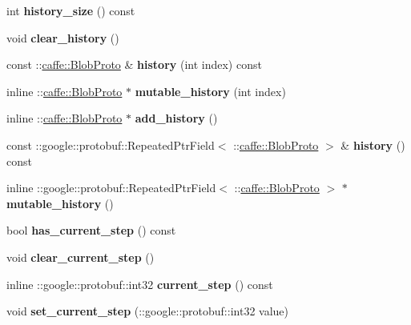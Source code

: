 \begin{DoxyCompactItemize}
int {\bfseries history\+\_\+size} () const
\item 
\mbox{\label{classcaffe_1_1_solver_state_ad98f3aa6b948cad80da8fd72570877a2}} 
void {\bfseries clear\+\_\+history} ()
\item 
\mbox{\label{classcaffe_1_1_solver_state_a9fec48ef8250b0900266065b971965c6}} 
const \+::\mbox{\hyperlink{classcaffe_1_1_blob_proto}{caffe\+::\+Blob\+Proto}} \& {\bfseries history} (int index) const
\item 
\mbox{\label{classcaffe_1_1_solver_state_a73b2b199b5419a7eff268b0538c77fc7}} 
inline \+::\mbox{\hyperlink{classcaffe_1_1_blob_proto}{caffe\+::\+Blob\+Proto}} $\ast$ {\bfseries mutable\+\_\+history} (int index)
\item 
\mbox{\label{classcaffe_1_1_solver_state_a37aaf2b5da324ce6027133ad365fcb21}} 
inline \+::\mbox{\hyperlink{classcaffe_1_1_blob_proto}{caffe\+::\+Blob\+Proto}} $\ast$ {\bfseries add\+\_\+history} ()
\item 
\mbox{\label{classcaffe_1_1_solver_state_af12b1f7a30482570f52ad4c43c80c051}} 
const \+::google\+::protobuf\+::\+Repeated\+Ptr\+Field$<$ \+::\mbox{\hyperlink{classcaffe_1_1_blob_proto}{caffe\+::\+Blob\+Proto}} $>$ \& {\bfseries history} () const
\item 
\mbox{\label{classcaffe_1_1_solver_state_abfa60fcbd2e29e327a987a3e83d6694c}} 
inline \+::google\+::protobuf\+::\+Repeated\+Ptr\+Field$<$ \+::\mbox{\hyperlink{classcaffe_1_1_blob_proto}{caffe\+::\+Blob\+Proto}} $>$ $\ast$ {\bfseries mutable\+\_\+history} ()
\item 
\mbox{\label{classcaffe_1_1_solver_state_aaff55a8c2e95ffd00f32014cb1b3fb6f}} 
bool {\bfseries has\+\_\+current\+\_\+step} () const
\item 
\mbox{\label{classcaffe_1_1_solver_state_ad64551e9bac605fd329ffcf6ac56790c}} 
void {\bfseries clear\+\_\+current\+\_\+step} ()
\item 
\mbox{\label{classcaffe_1_1_solver_state_a13a782fb065af2fac9d339425500b4ed}} 
inline \+::google\+::protobuf\+::int32 {\bfseries current\+\_\+step} () const
\item 
\mbox{\label{classcaffe_1_1_solver_state_ad6069ae4e6fddf0e72611b096e2a8148}} 
void {\bfseries set\+\_\+current\+\_\+step} (\+::google\+::protobuf\+::int32 value)
\end{DoxyCompactItemize}

